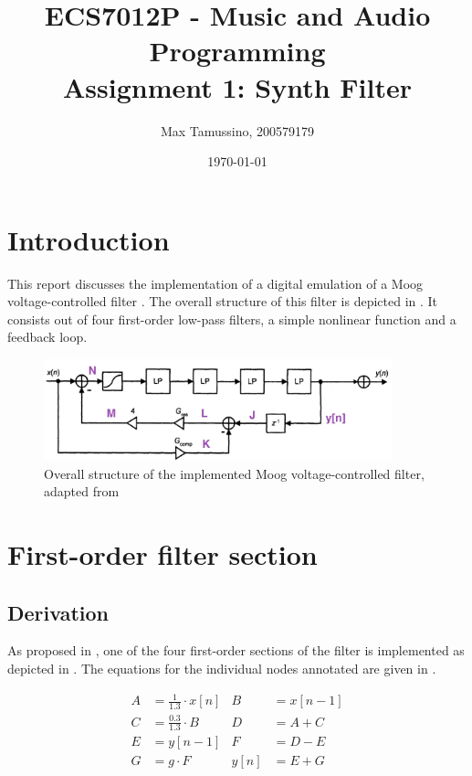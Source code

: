 \documentclass[a4paper, 12pt]{article}
\title{ECS7012P - Music and Audio Programming\\
	   Assignment 1: Synth Filter}
\author{
  Max Tamussino, 200579179
}
\date{\today}
\begin{document}
\maketitle
\tableofcontents
\pagebreak

\section{Introduction} \label{sec:intro}
This report discusses the implementation of a digital emulation \cite{Stilson1996} of a Moog voltage-controlled filter \cite{Moog1965}. The overall structure of this filter is depicted in . It consists out of four first-order low-pass filters, a simple nonlinear function and a feedback loop.

\begin{figure}[h!]
	\centering
	\includegraphics[width=0.9\textwidth]{feedback.jpg}
	\caption{Overall structure of the implemented Moog voltage-controlled filter, adapted from \cite{Vaelimaeki2006}}
	\label{fig:overall-structure}
\end{figure}

\section{First-order filter section} \label{sec:first-order-fs}
\subsection{Derivation}
As proposed in \cite{Vaelimaeki2006}, one of the four first-order sections of the filter is implemented as depicted in . The equations for the individual nodes annotated are given in . 

\begin{align}
	\label{eq:nodes1}
	A &= \frac{1}{1.3} \cdot x[n] & B &= x[n-1] \\
	\label{eq:nodes2}
	C &= \frac{0.3}{1.3} \cdot B & D &= A + C \\
	\label{eq:nodes3}
	E &= y[n-1] & F &= D - E \\
	\label{eq:nodes4}
	G &= g \cdot F & y[n] &= E + G
\end{align}
\end{document}
